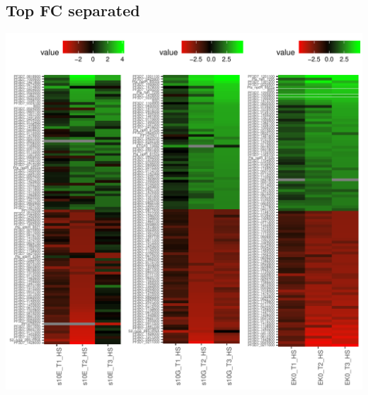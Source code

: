 \documentclass{article}\usepackage[]{graphicx}\usepackage[]{color}
\newenvironment{knitrout}{}{} %
\begin{document}
\subsection{Top FC separated}
\begin{knitrout}
\color{fgcolor}

{\centering \includegraphics[width=1\linewidth]{figure/minimal-heatmaps-1} 

}



\end{knitrout}
\clearpage
\end{document}
